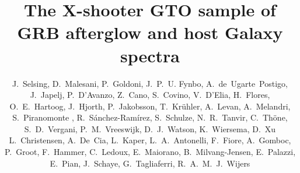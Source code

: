 \documentclass[iop, twocolappendix, numberedappendix, tighten, appendixfloats]{emulateapj}
\begin{document}
	
	\title{\vspace{-0.5cm}The X-shooter GTO sample of GRB afterglow and host Galaxy spectra}
	
	\author{
		J.~Selsing, 
		D.~Malesani, 
		P.~Goldoni, 
		J.~P.~U. Fynbo, 
		A.~de~Ugarte~Postigo, 
		J.~Japelj,
		P.~D'Avanzo,
		Z.~Cano,
		S.~Covino, 
		V.~D'Elia, 
		H.~Flores,
		O.~E.~Hartoog,
		J.~Hjorth, 
		P.~Jakobsson, 
		T.~Kr\"{u}hler, 
		A.~Levan,
		A.~Melandri,
		S.~Piranomonte ,
		R.~S\'anchez-Ram\'irez,
		S.~Schulze, 
		N.~R.~Tanvir,
		C.~Th{\"o}ne,
		S.~D.~Vergani,
		P.~M.~Vreeswijk, 
		D.~J.~Watson,
		K.~Wiersema,
		D.~Xu
		L.~Christensen,
		A.~De~Cia, 
		L.~Kaper, 
		L.~A.~Antonelli,
		F.~Fiore,
		A.~Gomboc,
		P.~Groot,
		F.~Hammer,
		C.~Ledoux, 
		E.~Maiorano,
		B.~Milvang-Jensen, 
		E.~Palazzi,
		E.~Pian,
		J.~Schaye,
		G.~Tagliaferri,
		R.~A.~M.~J.~Wijers
	}
	
\end{document}
